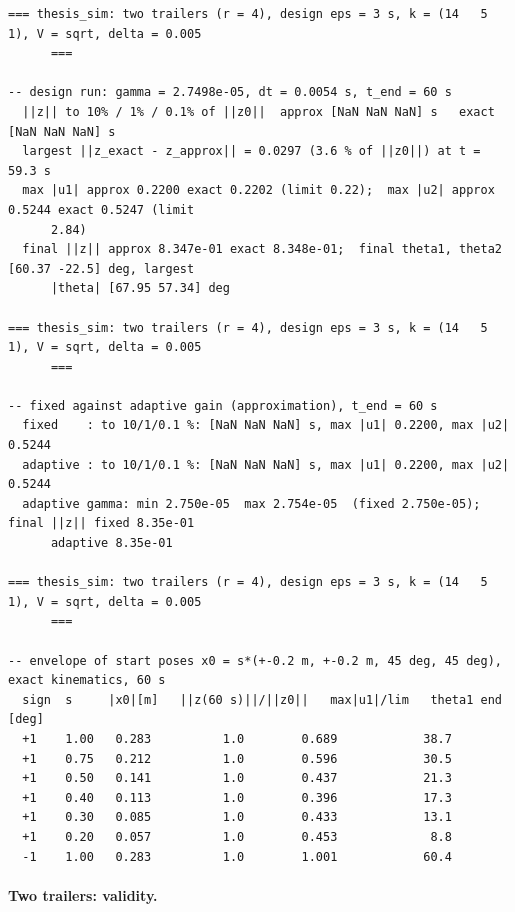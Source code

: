 {\scriptsize\begin{verbatim}
=== thesis_sim: two trailers (r = 4), design eps = 3 s, k = (14   5   1), V = sqrt, delta = 0.005
      ===

-- design run: gamma = 2.7498e-05, dt = 0.0054 s, t_end = 60 s
  ||z|| to 10% / 1% / 0.1% of ||z0||  approx [NaN NaN NaN] s   exact [NaN NaN NaN] s
  largest ||z_exact - z_approx|| = 0.0297 (3.6 % of ||z0||) at t = 59.3 s
  max |u1| approx 0.2200 exact 0.2202 (limit 0.22);  max |u2| approx 0.5244 exact 0.5247 (limit
      2.84)
  final ||z|| approx 8.347e-01 exact 8.348e-01;  final theta1, theta2 [60.37 -22.5] deg, largest
      |theta| [67.95 57.34] deg

=== thesis_sim: two trailers (r = 4), design eps = 3 s, k = (14   5   1), V = sqrt, delta = 0.005
      ===

-- fixed against adaptive gain (approximation), t_end = 60 s
  fixed    : to 10/1/0.1 %: [NaN NaN NaN] s, max |u1| 0.2200, max |u2| 0.5244
  adaptive : to 10/1/0.1 %: [NaN NaN NaN] s, max |u1| 0.2200, max |u2| 0.5244
  adaptive gamma: min 2.750e-05  max 2.754e-05  (fixed 2.750e-05);  final ||z|| fixed 8.35e-01
      adaptive 8.35e-01

=== thesis_sim: two trailers (r = 4), design eps = 3 s, k = (14   5   1), V = sqrt, delta = 0.005
      ===

-- envelope of start poses x0 = s*(+-0.2 m, +-0.2 m, 45 deg, 45 deg), exact kinematics, 60 s
  sign  s     |x0|[m]   ||z(60 s)||/||z0||   max|u1|/lim   theta1 end [deg]
  +1    1.00   0.283          1.0        0.689            38.7
  +1    0.75   0.212          1.0        0.596            30.5
  +1    0.50   0.141          1.0        0.437            21.3
  +1    0.40   0.113          1.0        0.396            17.3
  +1    0.30   0.085          1.0        0.433            13.1
  +1    0.20   0.057          1.0        0.453             8.8
  -1    1.00   0.283          1.0        1.001            60.4
\end{verbatim}}

\paragraph{Two trailers: validity.}


